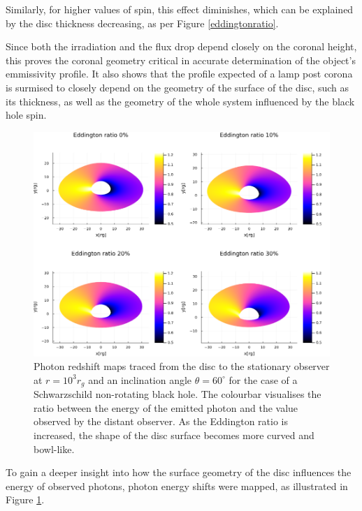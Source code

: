 \documentclass[fleqn,usenatbib,useAMS]{mnras}
\begin{document}
Similarly, for higher values of spin, this effect diminishes, which can be explained by the disc thickness decreasing, as per Figure \ref{eddingtonratio}. 

Since both the irradiation and the flux drop depend closely on the coronal height, this proves the coronal geometry critical in accurate determination of the object's emmissivity profile. It also shows that the profile expected of a lamp post corona is surmised to closely depend on the geometry of the surface of the disc, such as its thickness, as well as the geometry of the whole system influenced by the black hole spin.

\newpage

\begin{figure}
\includegraphics[width=\linewidth]{figures/redshift.png}
\caption{Photon redshift maps traced from the disc to the stationary observer at $r = 10^{3} r_{g}$ and an inclination angle $\theta = 60^{\circ}$ for the case of a Schwarzschild non-rotating black hole. The colourbar visualises the ratio between the energy of the emitted photon and the value observed by the distant observer. As the Eddington ratio is increased, the shape of the disc surface becomes more curved and bowl-like.}
\label{redshift}
\end{figure}

To gain a deeper insight into how the surface geometry of the disc influences the energy of observed photons, photon energy shifts were mapped, as illustrated in Figure \ref{redshift}.
\end{document}
